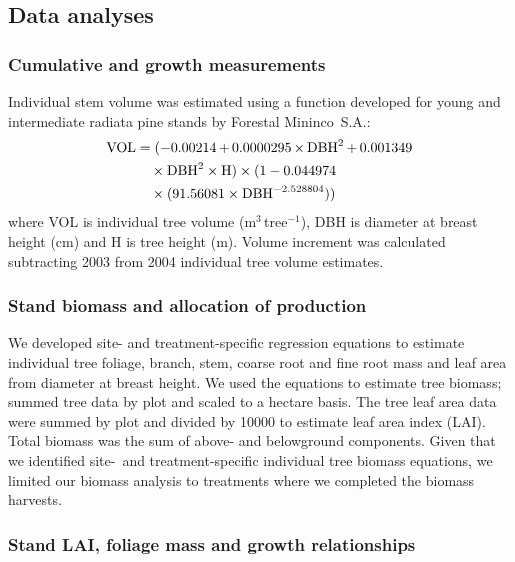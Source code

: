 \documentclass[final]{foresj}
\begin{document}
\subsection{Data analyses}

\subsubsection{Cumulative and growth measurements}

Individual stem volume was estimated using a function developed for young
and intermediate radiata\vadjust{\pagebreak} pine stands by Forestal Mininco~S.A.:
\begin{align}\label{eq1}
\hbox{VOL}&=(-0.00214 \,{+}\, 0.0000295\,{\times}\, \hbox{DBH}^{2} \,{+}\,0.001349 \notag\\
&\quad \times \hbox{DBH}^{2} \times \hbox{H})\times (1-0.044974\notag\\
&\quad \times (91.56081\times \hbox{DBH}^{-2.528804}))
\end{align}
where VOL is individual tree volume (m$^{3}$\,tree$^{-1}$),
DBH is diameter at breast height (cm) and H is tree height
(m). Volume increment was calculated subtracting 2003 from
2004 individual tree volume estimates.

\subsubsection{Stand biomass and allocation of production}

We developed site- and treatment-specific regression
equations to estimate individual tree foliage, branch,
stem, coarse root and fine root mass and leaf area from
diameter at breast height.\cite{42} We used the equations
to estimate tree biomass; summed tree data by plot and
scaled to a hectare basis. The tree leaf area data were
summed by plot and divided by 10000 to estimate leaf area
index (LAI). Total biomass was the sum of above- and
belowground components. Given that we identified site-~and treatment-specific individual tree biomass equations, we
limited our biomass analysis to treatments where we
completed the biomass harvests.

\subsubsection{Stand LAI, foliage mass and growth relationships}
\end{document}
